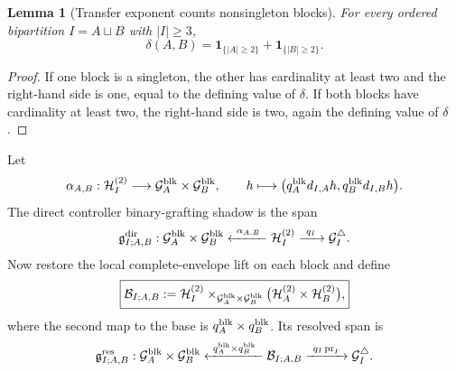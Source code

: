 \documentclass[11pt]{article}
\newtheorem{lemma}[theorem]{Lemma}
\theoremstyle{remark}
\begin{document}
\begin{lemma}[Transfer exponent counts nonsingleton blocks]
\label{P2M-lem:v16-delta-block-count}
For every ordered bipartition $I=A\sqcup B$ with $|I|\ge3$,
\begin{equation}
 \boxed{
 \delta(A,B)=
 \mathbf 1_{\{|A|\ge2\}}
 +\mathbf 1_{\{|B|\ge2\}}.}
\end{equation}
\end{lemma}

\begin{proof}
If one block is a singleton, the other has cardinality at least two and the
right-hand side is one, equal to the defining value of $\delta$.  If both
blocks have cardinality at least two, the right-hand side is two, again the
defining value of $\delta$.
\end{proof}

Let
\begin{equation}
 \alpha_{A,B}:\mathcal H_I^{(2)}\longrightarrow
 \mathcal G_A^{\rm blk}\times\mathcal G_B^{\rm blk},
 \qquad
 h\longmapsto
 \bigl(q_A^{\rm blk}d_{I,A}h,
       q_B^{\rm blk}d_{I,B}h\bigr).
\end{equation}
The direct controller binary-grafting shadow is the span
\begin{equation}
 \mathfrak g^{\rm dir}_{I;A,B}:
 \mathcal G_A^{\rm blk}\times\mathcal G_B^{\rm blk}
 \xleftarrow{\ \alpha_{A,B}\ }
 \mathcal H_I^{(2)}
 \xrightarrow{\ q_I\ }
 \mathcal G_I^{\triangle}.
\end{equation}
Now restore the local complete-envelope lift on each block and define
\begin{equation}\label{P2M-eq:v16-resolved-middle}
 \boxed{
 \mathcal B_{I;A,B}:=
 \mathcal H_I^{(2)}
 \times_{\mathcal G_A^{\rm blk}\times\mathcal G_B^{\rm blk}}
 \bigl(\mathcal H_A^{(2)}\times\mathcal H_B^{(2)}\bigr),}
\end{equation}
where the second map to the base is
$q_A^{\rm blk}\times q_B^{\rm blk}$.  Its resolved span is
\begin{equation}\label{P2M-eq:v16-resolved-binary-span}
 \mathfrak g^{\rm res}_{I;A,B}:
 \mathcal G_A^{\rm blk}\times\mathcal G_B^{\rm blk}
 \xleftarrow{\ q_A^{\rm blk}\times q_B^{\rm blk}\ }
 \mathcal B_{I;A,B}
 \xrightarrow{\ q_I\operatorname{pr}_I\ }
 \mathcal G_I^{\triangle}.
\end{equation}
\end{document}
